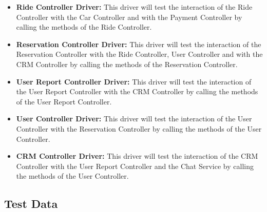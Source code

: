 \documentclass[a4paper]{article}
\begin{document}
\begin{itemize}
\item \textbf{Ride Controller Driver:} This driver will test the interaction of the Ride Controller with the Car Controller and with the Payment Controller by calling the methods of the Ride Controller. 


\item \textbf{Reservation Controller Driver:} This driver will test the interaction of the Reservation Controller with the Ride Controller, User Controller and with the CRM Controller by calling the methods of the Reservation Controller. 


\item \textbf{User Report Controller Driver:}  This driver will test the interaction of the User Report Controller with the CRM Controller by calling the methods of the User Report Controller. 

\item \textbf{User Controller Driver:} This driver will test the interaction of the User Controller with the Reservation Controller by calling the methods of the User Controller. 


\item \textbf{CRM Controller Driver: } This driver will test the interaction of the CRM Controller with the User Report Controller and the Chat Service by calling the methods of the User Controller. 
\end{itemize}  

\subsection{Test Data}

\newpage
\end{document}
